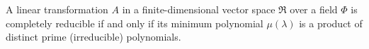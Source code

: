 A linear transformation $A$ in a finite-dimensional vector space $\mathfrak{R}$ over a field $\Phi$ is completely reducible if and only if its minimum polynomial $\mu(\lambda)$ is a product of distinct prime (irreducible) polynomials.
